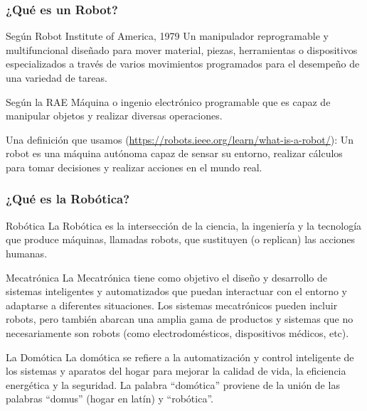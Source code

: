 \begin{frame}
	\frametitle{¿Qué es un Robot?}
	
	\begin{block}{Según Robot Institute of America, 1979}
		Un manipulador reprogramable y multifuncional diseñado para mover material, piezas, herramientas o dispositivos especializados a través de varios movimientos programados para el desempeño de una variedad de tareas.
	\end{block}
	
	\begin{block}{Según la RAE}
		Máquina o ingenio electrónico programable que es capaz de manipular objetos y realizar diversas operaciones.
	\end{block}
	
	\begin{block}{Una definición que usamos (\url{https://robots.ieee.org/learn/what-is-a-robot/}):}
		Un robot es una máquina autónoma capaz de sensar su entorno, realizar cálculos para tomar decisiones y realizar acciones en el mundo real.
	\end{block}
	
\end{frame}

\begin{frame}
	\frametitle{¿Qué es la Robótica?}
	
	\begin{block}{Robótica}
	La Robótica es la intersección de la ciencia, la ingeniería y la tecnología que produce máquinas, llamadas robots, que sustituyen (o replican) las acciones humanas.
	\end{block}
	
	\begin{block}{Mecatrónica}
	La Mecatrónica tiene como objetivo el diseño y desarrollo de sistemas inteligentes y automatizados que puedan interactuar con el entorno y adaptarse a diferentes situaciones. Los sistemas mecatrónicos pueden incluir robots, pero también abarcan una amplia gama de productos y sistemas que no necesariamente son robots (como electrodomésticos, dispositivos médicos, etc).
	\end{block}
	
	\begin{block}{La Domótica}
	La domótica se refiere a la automatización y control inteligente de los sistemas y aparatos del hogar para mejorar la calidad de vida, la eficiencia energética y la seguridad. La palabra ``domótica'' proviene de la unión de las palabras ``domus'' (hogar en latín) y ``robótica''.
	\end{block}
	
\end{frame}



